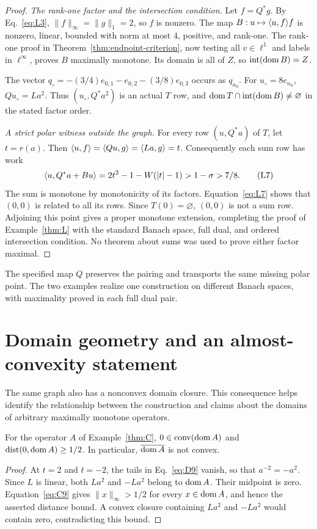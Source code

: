 \begin{proof}
\noindent\textit{The rank-one factor and the intersection condition.}
\label{sec:L4}
Let $f=Q^*g$. By Eq.~\eqref{eq:L3}, $\|f\|_\infty=\|g\|_1=2$, so $f$
is nonzero. The map $B:u\mapsto\langle u,f\rangle f$ is nonzero, linear, bounded
with norm at most $4$, positive, and rank-one. The rank-one proof in
Theorem~\ref{thm:endpoint-criterion}, now testing all $v\in\ell^1$
and labels in $\ell^\infty$, proves $B$ maximally monotone.
Its domain is all of $Z$, so $\operatorname{int}(\operatorname{dom} B)=Z$.

The vector $q_\circ=-(3/4)e_{0,1}-e_{0,2}-(3/8)e_{0,3}$ occurs as
$q_{n_0}$. For $u_\circ=8e_{n_0}$, $Qu_\circ=La^2$.
Thus $(u_\circ,Q^*a^2)$ is an actual $T$ row, and
$\operatorname{dom} T\cap\operatorname{int}(\operatorname{dom} B)\ne\varnothing$ in the stated
factor order.

\noindent\textit{A strict polar witness outside the graph.}
\label{sec:L5}
For every row $(u,Q^*a)$ of $T$, let $t=r(a)$. Then
$\langle u,f\rangle=\langle Qu,g\rangle=\langle La,g\rangle=t$.
Consequently each sum row has work
\begin{equation}
\langle u,Q^*a+Bu\rangle
 =2t^2-1-W(|t|-1)>1-\sigma>7/8.
\tag{L7}\label{eq:L7}
\end{equation}
The sum is monotone by monotonicity of its factors.
Equation~\eqref{eq:L7} shows that $(0,0)$ is related to all its rows.
Since $T(0)=\varnothing$, $(0,0)$ is not a sum row. Adjoining this point
gives a proper monotone extension, completing the proof of
Example~\ref{thm:L} with the standard Banach space, full dual, and ordered
intersection condition. No theorem about sums was used to prove either
factor maximal.
\end{proof}

The specified map $Q$ preserves the pairing and transports the same
missing polar point. The two examples realize one construction on
different Banach spaces, with maximality proved in each full dual pair.

\section{Domain geometry and an almost-convexity statement}
\label{sec:domain-comparison}
The same graph also has a nonconvex domain closure. This consequence
helps identify the relationship between the construction and claims
about the domains of arbitrary maximally monotone operators.

\begin{proposition}\label{prop:domain-gap}
For the operator $A$ of Example~\ref{thm:C},
$0\in\operatorname{conv}(\operatorname{dom} A)$ and
$\operatorname{dist}(0,\operatorname{dom} A)\ge1/2$.
In particular, $\overline{\operatorname{dom} A}$ is not convex.
\end{proposition}
\begin{proof}
At $t=2$ and $t=-2$, the tails in Eq.~\eqref{eq:D9} vanish, so that
$a^{-2}=-a^2$. Since $L$ is linear, both $La^2$ and $-La^2$ belong
to $\operatorname{dom} A$. Their midpoint is zero. Equation~\eqref{eq:C9} gives
$\|x\|_\infty>1/2$ for every $x\in\operatorname{dom} A$, and hence the asserted
distance bound. A convex closure containing $La^2$ and $-La^2$ would
contain zero, contradicting this bound.
\end{proof}


